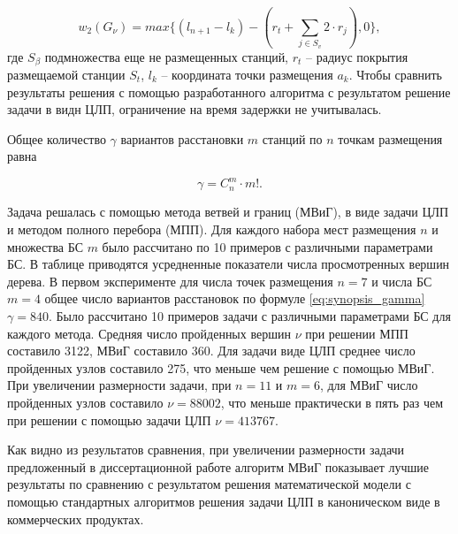 \begin{displaymath}
w_2 \left(G_\nu \right) = max\{\left(l_{n+1}-l_k\right)-(r_t+\sum_{j\in S_v}{2 \cdot r_j}),0\},
\end{displaymath}
где $S_\beta$ подмножества еще не размещенных станций, $r_t$ -- радиус покрытия размещаемой станции $S_t$, $l_k$ -- координата точки размещения $a_k$. Чтобы сравнить результаты решения с помощью разработанного алгоритма с результатом решение задачи в видн ЦЛП, ограничение на время задержки не учитывалась.

Общее количество $\gamma$ вариантов расстановки $m$ станций по $n$ точкам размещения равна 

\begin{equation}
  \label{eq:synopsis_gamma}
  \gamma = C^m_n \cdot m! .
\end{equation}

  
Задача решалась с помощью метода ветвей и границ (МВиГ), в виде задачи ЦЛП и методом полного перебора (МПП). Для каждого набора мест размещения $n$ и множества БС $m$  было рассчитано по 10 примеров с различными параметрами БС. В таблице приводятся усредненные показатели числа просмотренных вершин дерева. В первом эксперименте для числа точек размещения $n=7$ и числа БС $m=4$ общее число вариантов расстановок по формуле \cref{eq:synopsis_gamma} $\gamma = 840$. Было рассчитано 10 примеров задачи с различными параметрами БС для каждого метода. Средняя число пройденных вершин $\nu$ при решении МПП составило 3122, МВиГ составило 360. Для задачи виде ЦЛП  среднее число пройденных узлов составило 275, что меньше чем решение с помощью МВиГ. При увеличении размерности задачи, при $n=11$ и $m=6$,  для МВиГ число пройденных узлов составило $\nu = 88002$, что меньше практически в пять раз чем при решении с помощью задачи ЦЛП $\nu=413767$.

Как видно из результатов сравнения, при увеличении размерности задачи предложенный в диссертационной работе алгоритм МВиГ показывает лучшие результаты по сравнению с результатом решения математической модели с помощью стандартных алгоритмов решения задачи ЦЛП в каноническом виде в коммерческих продуктах.




